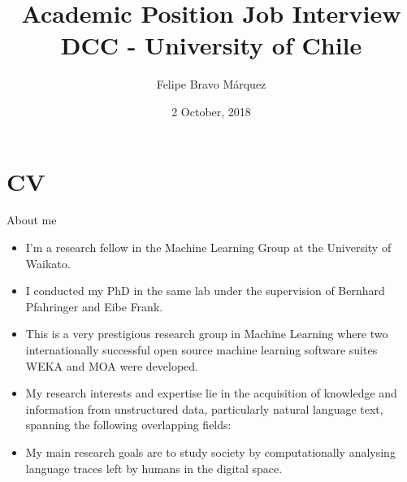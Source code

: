 \documentclass[handout]{beamer}
\title{Academic Position Job Interview\\ DCC - University of Chile}
\author[Felipe Bravo Márquez]{Felipe Bravo Márquez}
\date{2 October, 2018}
\begin{document}
\begin{frame}
\titlepage


\end{frame}




\section{CV}


\begin{frame}{About me}
\begin{scriptsize}
\begin{itemize}
 \item I'm a research fellow in the Machine Learning Group at the University of Waikato. 
 \item I conducted my PhD in the same lab under the supervision of Bernhard Pfahringer and Eibe Frank.
 \item This is a very prestigious research group in Machine Learning where two internationally successful open source machine learning software suites WEKA and MOA were developed. 
 \item My research interests and expertise lie in the acquisition of knowledge and information from unstructured data, particularly natural language text, spanning the following overlapping fields:
\begin{enumerate}
\end{enumerate}

\item My main research goals are to study society by computationally analysing language traces left by humans in the digital space.


\end{itemize}


\end{scriptsize}

\end{frame}
\end{document}
